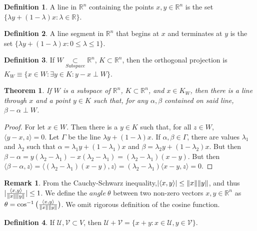 \documentclass[oneside]{book}
\newtheorem{theorem}{Theorem}[section]
\theoremstyle{definition}
\newtheorem{definition}{Definition}[section]
\newtheorem{remark}{Remark}[section]
\begin{document}
\begin{definition}
A line in $\mathbb{R}^n$ containing the points $x,y\in \mathbb{R}^n$ is the set $\{\lambda y + (1-\lambda)x: \lambda \in \mathbb{R}\}$.
\end{definition}

\begin{definition}
A line segment in $\mathbb{R}^n$ that begins at $x$ and terminates at $y$ is the set $\{\lambda y + (1-\lambda)x: 0\leq \lambda \leq 1 \}$.
\end{definition}

\begin{definition}
If $W\underset{Subspace}\subset\mathbb{R}^n$, $K \subset \mathbb{R}^n$, then the orthogonal projection is $K_{W}\equiv\{x\in W: \exists y\in K: y-x \perp W\}$.
\end{definition}

\begin{theorem}
If $W$ is a subspace of $\mathbb{R}^n$, $K \subset \mathbb{R}^n$, and $x\in K_{W}$, then there is a line through $x$ and a point $y\in K$ such that, for any $\alpha, \beta$ contained on said line, $\beta-\alpha \perp W$.
\end{theorem}
\begin{proof}
For let $x\in W$. Then there is a $y\in K$ such that, for all $z\in W$, $\langle y-x,z\rangle = 0$. Let $\Gamma$ be the line $\lambda y + (1-\lambda)x$. If $\alpha,\beta \in \Gamma$, there are values $\lambda_1$ and $\lambda_2$ such that $\alpha = \lambda_1 y+ (1-\lambda_1)x$ and $\beta = \lambda_2 y +(1-\lambda_2)x$. But then $\beta-\alpha = y(\lambda_2-\lambda_1)-x(\lambda_2-\lambda_1) = (\lambda_2-\lambda_1)(x-y)$. But then $\langle \beta - \alpha,z\rangle = \langle (\lambda_2-\lambda_1)(x-y),z\rangle = (\lambda_2-\lambda_1)\langle x-y,z \rangle = 0$.
\end{proof}

\begin{remark}
From the Cauchy-Schwarz inequality,$|\langle x,y \rangle| \leq \norm{x}\norm{y}$, and thus $|\frac{\langle x,y \rangle}{\norm{x}\norm{y}}| \leq 1$. We define the $angle\ \theta$ between two non-zero vectors $x,y\in \mathbb{R}^n$ as $\theta=\cos^{-1}\big(\frac{\langle x,y \rangle}{\norm{x}\norm{y}}\big)$. We omit rigorous definition of the cosine function.
\end{remark}

\begin{definition}
If $\mathcal{U},\mathcal{V}\subset V$, then $\mathcal{U}+\mathcal{V} = \{x+y:x\in \mathcal{U},y\in \mathcal{V}\}$.
\end{definition}
\end{document}
